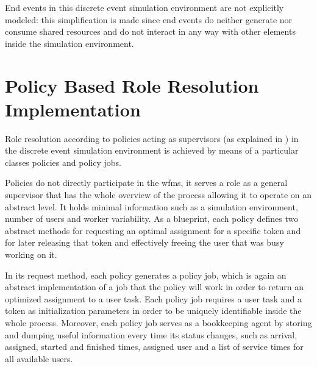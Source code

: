 End events in this discrete event simulation environment are not explicitly modeled: this simplification is made since end events do neither generate nor consume shared resources and do not interact in any way with other elements inside the simulation environment.

\section{Policy Based Role Resolution Implementation}
\label{sec:policy_implementation}

Role resolution according to policies acting as supervisors (as explained in ) in the discrete event simulation environment is achieved by means of a particular classes \ie policies and policy jobs.

Policies do not directly participate in the \gls{wfms}, it serves a role as a general supervisor that has the whole overview of the process allowing it to operate on an abstract level. It holds minimal information such as a simulation environment, number of users and worker variability. As a blueprint, each policy defines two abstract methods for requesting an optimal assignment for a specific token and for later releasing that token and effectively freeing the user that was busy working on it.

In its request method, each policy generates a policy job, which is again an abstract implementation of a job that the policy will work in order to return an optimized assignment to a user task. Each policy job requires a user task and a token as initialization parameters in order to be uniquely identifiable inside the whole process. Moreover, each policy job serves as a bookkeeping agent by storing and dumping useful information every time its status changes, such as arrival, assigned, started and finished times, assigned user and a list of service times for all available users.

